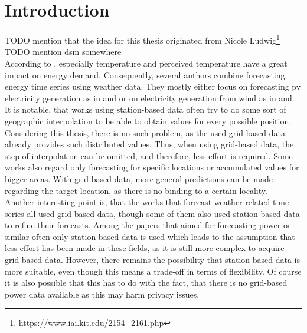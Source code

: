 \chapter{Introduction}
\label{ch:Introduction}

TODO mention that the idea for this thesis originated from Nicole Ludwig\footnote{\url{https://www.iai.kit.edu/2154_2161.php}}\label{ack:nicole}\\

TODO mention \gls{dsm} somewhere\\

According to , especially temperature and perceived temperature have a great impact on energy demand. Consequently, several authors combine forecasting energy time series using weather data. They mostly either focus on forecasting \gls{pv} electricity generation as in  and  or on electricity generation from wind as in  and .\\

It is notable, that works using station-based data often try to do some sort of geographic interpolation to be able to obtain values for every possible position. Considering this thesis, there is no such problem, as the used grid-based data already provides such distributed values. Thus, when using grid-based data, the step of interpolation can be omitted, and therefore, less effort is required. Some works also regard only forecasting for specific locations or accumulated values for bigger areas. With grid-based data, more general predictions can be made regarding the target location, as there is no binding to a certain locality.\\

Another interesting point is, that the works that forecast weather related time series all used grid-based data, though some of them also used station-based data to refine their forecasts. Among the papers that aimed for forecasting power or similar often only station-based data is used which leads to the assumption that less effort has been made in these fields, as it is still more complex to acquire grid-based data. However, there remains the possibility that station-based data is more suitable, even though this means a trade-off in terms of flexibility. Of course it is also possible that this has to do with the fact, that there is no grid-based power data available as this may harm privacy issues.\\

